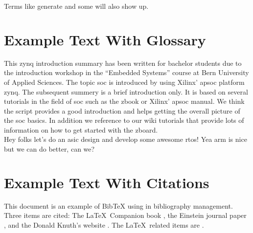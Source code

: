 Terms like generate and some will 
also show up.

\section{Example Text With Glossary}
This \Gls{zynq} introduction summary has been written for bachelor students due to the introduction workshop in the ``Embedded Systems'' course at Bern University of Applied Sciences. The topic \Gls{soc} is introduced by using Xilinx' \Gls{apsoc} platform \Gls{zynq}. The subsequent summery is a brief introduction only. It is based on several tutorials in the field of \Gls{soc} such as the \Gls{zbook} or Xilinx' \Gls{apsoc} manual. We think the script provides a good introduction and helps getting the overall picture of the \Gls{soc} basics. In addition we reference to our wiki tutorials that provide lots of information on how to get started with the \Gls{zboard}.\\

Hey folks let's do an \Gls{asic} design and develop some awesome \Gls{rtos}! Yea \Gls{arm} is nice but we can do better, can we?

\section{Example Text With Citations}

This document is an example of \Gls{BibTeX} using in bibliography management. Three items 
are cited: The \LaTeX\ Companion book \cite{latexcompanion}, the Einstein
journal paper \cite{einstein}, and the Donald Knuth's website \cite{knuthwebsite}. 
The \LaTeX\ related items are \cite{latexcompanion,knuthwebsite}.

